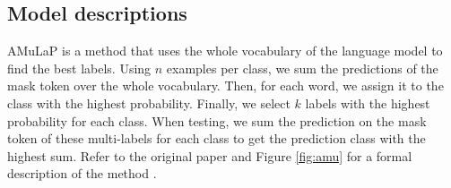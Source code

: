 \subsection{Model descriptions}
\label{section:model}


AMuLaP is a method that uses the whole vocabulary of the language model to find the best labels. Using \(n\) examples per class, we sum the predictions of the mask token over the whole vocabulary. Then, for each word, we assign it to the class with the highest probability. Finally, we select \(k\) labels with the highest probability for each class. When testing, we sum the prediction on the mask token of these multi-labels for each class to get the prediction class with the highest sum. Refer to the original paper and Figure \ref{fig:amu} for a formal description of the method \citep{Wang}.

